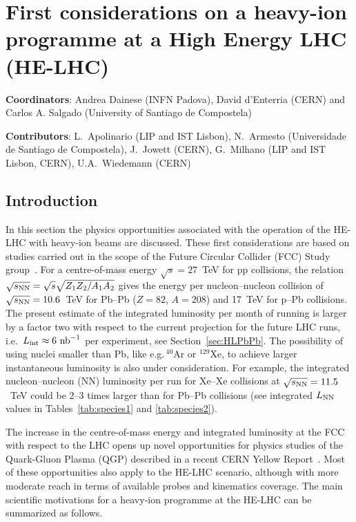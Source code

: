 \documentclass[../report.tex]{subfiles}
\begin{document}
\section{First considerations on a heavy-ion programme at a High Energy LHC (HE-LHC)}
\label{sec:HELHC}

{ \small
\noindent \textbf{Coordinators}: Andrea Dainese (INFN Padova), David d'Enterria (CERN) and Carlos A. Salgado (University of Santiago de Compostela)

\noindent \textbf{Contributors}: 
L.~Apolinario (LIP and IST Lisbon), 
N.~Armesto (Universidade de Santiago de Compostela), 
J.~Jowett (CERN), 
G.~Milhano (LIP and IST Lisbon, CERN), 
U.A.~Wiedemann (CERN)
}

\subsection{Introduction}
\label{sec:HELHC_intro}

In this section the physics opportunities associated with the operation of the HE-LHC with heavy-ion beams are discussed.
These first considerations are based on studies carried out in the scope of the Future Circular Collider (FCC) Study group~\cite{Dainese:2016gch,FCC-CDR}.
For a centre-of-mass energy $\sqrt{s}= 27$~TeV for pp collisions, the relation $\sqrt{s_{\rm NN}}= \sqrt {s} \sqrt{Z_1 Z_2 / A_1 A_2}$ 
gives the energy per nucleon--nucleon collision of $\sqrt{s_{\rm NN}} = 10.6$~TeV for Pb--Pb ($Z=82$, $A=208$) and 17~TeV for p--Pb collisions. 
The present estimate of the integrated luminosity per month of running is larger by a factor two with respect to the current projection for the future 
LHC runs, i.e.\, $L_{\rm int}\approx 6~{\rm nb}^{-1}$ per experiment, see Section~\ref{sec:HLPbPb}. 
The possibility of using nuclei smaller than Pb, like e.g.\,$^{40}$Ar or $^{129}$Xe, to achieve larger instantaneous luminosity is also under consideration. 
For example, the integrated nucleon--nucleon (NN) luminosity per run 
for Xe--Xe collisions at $\sqrt{s_{\rm NN}}= 11.5$~TeV could be 2--3 times larger than for Pb--Pb collisions (see integrated $L_{\rm NN}$ values in Tables~\ref{tab:species1} and \ref{tab:species2}).

The increase in the centre-of-mass energy and integrated luminosity at the FCC with respect to the LHC opens up novel opportunities for physics studies of the Quark-Gluon Plasma (QGP) described in a recent CERN Yellow Report~\cite{Dainese:2016gch}. Most of these opportunities also apply to the HE-LHC scenario, although 
with more moderate reach in terms of available probes and kinematics coverage.
The main scientific motivations for a heavy-ion programme at the HE-LHC can be summarized as follows.
\end{document}
